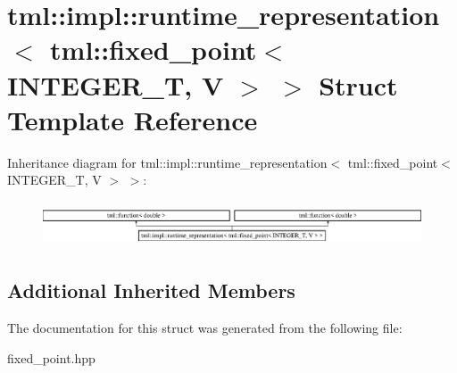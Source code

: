 \hypertarget{structtml_1_1impl_1_1runtime__representation_3_01tml_1_1fixed__point_3_01INTEGER__T_00_01V_01_4_01_4}{\section{tml\+:\+:impl\+:\+:runtime\+\_\+representation$<$ tml\+:\+:fixed\+\_\+point$<$ I\+N\+T\+E\+G\+E\+R\+\_\+\+T, V $>$ $>$ Struct Template Reference}
\label{structtml_1_1impl_1_1runtime__representation_3_01tml_1_1fixed__point_3_01INTEGER__T_00_01V_01_4_01_4}
}
Inheritance diagram for tml\+:\+:impl\+:\+:runtime\+\_\+representation$<$ tml\+:\+:fixed\+\_\+point$<$ I\+N\+T\+E\+G\+E\+R\+\_\+\+T, V $>$ $>$\+:\begin{figure}[H]
\begin{center}
\leavevmode
\includegraphics[height=1.359223cm]{structtml_1_1impl_1_1runtime__representation_3_01tml_1_1fixed__point_3_01INTEGER__T_00_01V_01_4_01_4}
\end{center}
\end{figure}
\subsection*{Additional Inherited Members}


The documentation for this struct was generated from the following file\+:\begin{DoxyCompactItemize}
\item 
fixed\+\_\+point.\+hpp\end{DoxyCompactItemize}
